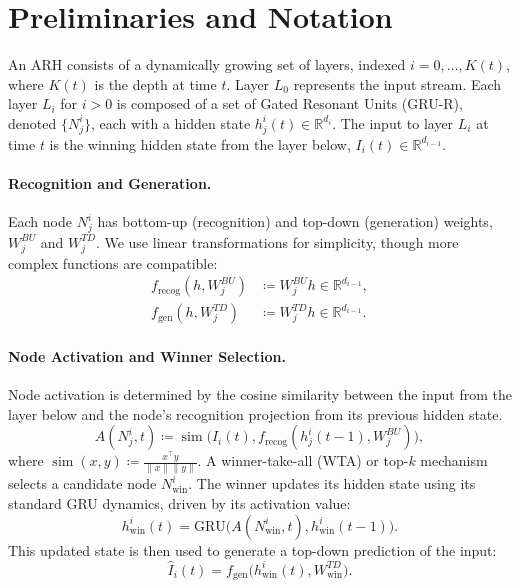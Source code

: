 \documentclass{article}
\DeclareMathOperator{\simop}{sim}
\begin{document}
\section{Preliminaries and Notation}
An ARH consists of a dynamically growing set of layers, indexed $i=0, \dots, K(t)$, where $K(t)$ is the depth at time $t$. Layer $L_0$ represents the input stream. Each layer $L_i$ for $i>0$ is composed of a set of Gated Resonant Units (GRU-R), denoted $\{N_j^i\}$, each with a hidden state $h_j^i(t) \in \mathbb{R}^{d_i}$. The input to layer $L_i$ at time $t$ is the winning hidden state from the layer below, $I_i(t) \in \mathbb{R}^{d_{i-1}}$.

\paragraph{Recognition and Generation.} Each node $N_j^i$ has bottom-up (recognition) and top-down (generation) weights, $W_j^{BU}$ and $W_j^{TD}$. We use linear transformations for simplicity, though more complex functions are compatible:
\begin{align}
    f_{\text{recog}}(h, W_j^{BU}) &\coloneqq W_j^{BU} h \in \mathbb{R}^{d_{i-1}}, \\
    f_{\text{gen}}(h, W_j^{TD}) &\coloneqq W_j^{TD} h \in \mathbb{R}^{d_{i-1}}.
\end{align}

\paragraph{Node Activation and Winner Selection.} Node activation is determined by the cosine similarity between the input from the layer below and the node's recognition projection from its previous hidden state.
\begin{equation}
    A(N_j^i, t) \coloneqq \simop\big(I_i(t), f_{\text{recog}}(h_j^i(t-1), W_j^{BU})\big),
\end{equation}
where $\simop(x,y) \coloneqq \frac{x^\top y}{\|x\|\|y\|}$. A winner-take-all (WTA) or top-$k$ mechanism selects a candidate node $N_{\text{win}}^i$. The winner updates its hidden state using its standard GRU dynamics, driven by its activation value:
\begin{equation}
    h_{\text{win}}^i(t) = \text{GRU}\big(A(N_{\text{win}}^i, t), h_{\text{win}}^i(t-1)\big).
\end{equation}
This updated state is then used to generate a top-down prediction of the input:
\begin{equation}
    \hat{I}_i(t) = f_{\text{gen}}\big(h_{\text{win}}^i(t), W_{\text{win}}^{TD}\big).
\end{equation}
\end{document}

